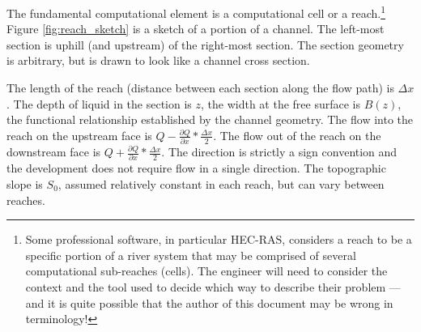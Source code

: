 The fundamental computational element is a computational cell or a reach.\footnote{Some professional software, in particular HEC-RAS, considers a reach to be a specific portion of a river system that may be comprised of several computational sub-reaches (cells).  The engineer will need to consider the context and the tool used to decide which way to describe their problem --- and it is quite possible that the author of this document may be wrong in terminology!}
Figure \ref{fig:reach_sketch} is a sketch of a portion of a channel.  The left-most section is uphill (and upstream) of the right-most section.
The section geometry is arbitrary, but is drawn to look like a channel cross section.

The length of the reach (distance between each section along the flow path) is $\Delta x$.  The depth of liquid in the section is $z$, the width at the free surface is $B(z)$, the functional relationship established by the channel geometry.  
The flow into the reach on the upstream face is $Q-\frac{\partial Q}{\partial x}*\frac{\Delta x}{2}$.  The flow out of  the reach on the downstream face is $Q+\frac{\partial Q}{\partial x}*\frac{\Delta x}{2}$.  The direction is strictly a sign convention and the development does not require flow in a single direction.  The topographic slope is $S_0$, assumed relatively constant in each reach, but can vary between reaches.  




